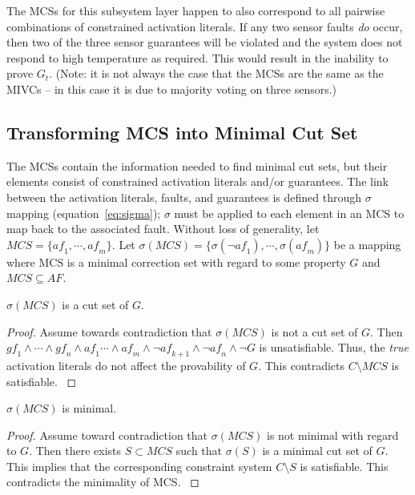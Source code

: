 The MCSs for this subsystem layer happen to also correspond to all pairwise combinations of constrained activation literals. If any two sensor faults {\em do} occur, then two of the three sensor guarantees will be violated and the system does not respond to high temperature as required. This would result in the inability to prove $G_t$. (Note: it is not always the case that the MCSs are the same as the MIVCs -- in this case it is due to majority voting on three sensors.)

\subsection{Transforming MCS into Minimal Cut Set}
The MCSs contain the information needed to find minimal cut sets, but their elements consist of constrained activation literals and/or guarantees. The link between the activation literals, faults, and guarantees is defined through $\sigma$ mapping (equation~\ref{eq:sigma}); $\sigma$ must be applied to each element in an MCS to map back to the associated fault. Without loss of generality, let $MCS = \{\mathit{af}_1, \cdots, \mathit{af}_m\}$. Let $\sigma (MCS) = \{\sigma (\neg \mathit{af}_{1}), \cdots, \sigma (\mathit{af}_{m})\}$ be a mapping where MCS is a minimal correction set with regard to some property $G$ and $MCS  \subseteq AF$. 

\begin{lemma} $\sigma (MCS)$ is a cut set of $G$. 
\begin{proof}
Assume towards contradiction that $\sigma (MCS)$ is not a cut set of $G$. Then $\mathit{gf}_1 \land \cdots \land \mathit{gf}_n \land \mathit{af}_1 \cdots \land \mathit{af}_m \land \neg \mathit{af}_{k+1} \land \neg \mathit{af}_n \land \neg G$ is unsatisfiable. Thus, the \emph{true} activation literals do not affect the provability of $G$. This contradicts $C \setminus MCS$ is satisfiable. 
\label{lemma:cut}
\end{proof}
\end{lemma}

\begin{lemma} $\sigma(MCS)$ is minimal.
\begin{proof}
Assume toward contradiction that $\sigma(MCS)$ is not minimal with regard to $G$. Then there exists $S \subset MCS$ such that $\sigma(S)$ is a minimal cut set of $G$. This implies that the corresponding constraint system $C \setminus S$ is satisfiable. This contradicts the minimality of MCS.
\label{lemma:min}
\end{proof}
\end{lemma}


